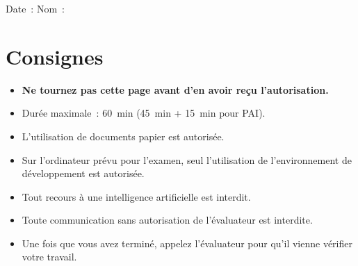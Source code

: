 \noindent{}%
%
\noindent{}%
Date~: \fillin[][3cm] \hfill{} Nom~: \fillin[][8cm]

\vspace{1em}

\noindent{}%
\textbf{\thetitle{} \hfill{} \thesubtitle{}}


\vspace{1em}

\section*{Consignes}

\begin{itemize}
	\item \textbf{Ne tournez pas cette page avant d'en avoir reçu l'autorisation.}
	\item Durée maximale~: \qty{60}{\minute} (\qty{45}{\minute} + \qty{15}{\minute} pour PAI).
	\item L'utilisation de documents papier est autorisée.
	\item Sur l'ordinateur prévu pour l'examen, seul l'utilisation de l'environnement de développement est autorisée.
	\item Tout recours à une intelligence artificielle est interdit.
	\item Toute communication sans autorisation de l'évaluateur est interdite.
	\item Une fois que vous avez terminé, appelez l'évaluateur pour qu'il vienne vérifier votre travail.
\end{itemize}

